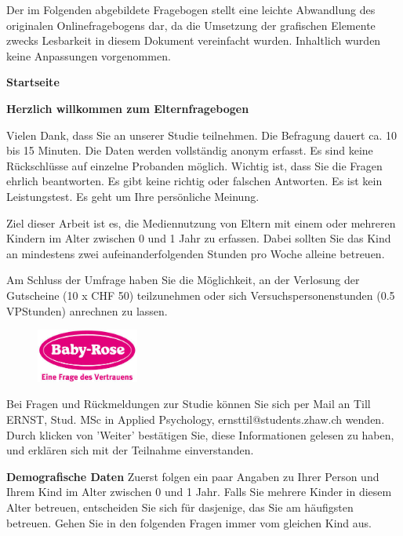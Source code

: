 Der im Folgenden abgebildete Fragebogen stellt eine leichte Abwandlung des originalen Onlinefragebogens dar, da die Umsetzung der grafischen Elemente zwecks Lesbarkeit in diesem Dokument vereinfacht wurden. Inhaltlich wurden keine Anpassungen vorgenommen.

\begin{flushleft}
\textbf{Startseite}

\textbf{Herzlich willkommen zum Elternfragebogen}

\vspace{2mm}
Vielen Dank, dass Sie an unserer Studie teilnehmen. Die Befragung dauert ca. 10 bis 15 Minuten. Die Daten werden vollständig anonym erfasst. Es sind keine Rückschlüsse auf einzelne Probanden möglich. Wichtig ist, dass Sie die Fragen ehrlich beantworten. Es gibt keine richtig oder falschen Antworten. Es ist kein Leistungstest. Es geht um Ihre persönliche Meinung.

\vspace{2mm}
Ziel dieser Arbeit ist es, die Mediennutzung von Eltern mit einem oder mehreren Kindern im Alter zwischen 0 und 1 Jahr zu erfassen. Dabei sollten Sie das Kind an mindestens zwei aufeinanderfolgenden Stunden pro Woche alleine betreuen.

\vspace{2mm}
Am Schluss der Umfrage haben Sie die Möglichkeit, an der Verlosung der Gutscheine (10 x CHF 50) teilzunehmen oder sich Versuchspersonenstunden (0.5 VPStunden) anrechnen zu lassen.

\begin{figure}[hbtp]
  \centering
     \includegraphics[width=0.3\textwidth]{content/Grafik/babyRose_Logo.jpg}
  \label{fig:babyRose_Logo}
\end{figure}

Bei Fragen und Rückmeldungen zur Studie können Sie sich per Mail an Till ERNST, Stud. MSc in Applied Psychology, ernsttil@students.zhaw.ch wenden. Durch klicken von 'Weiter' bestätigen Sie, diese Informationen gelesen zu haben, und erklären sich mit der Teilnahme einverstanden.

\bigskip
\textbf{Demografische Daten}
Zuerst folgen ein paar Angaben zu Ihrer Person und Ihrem Kind im Alter zwischen 0 und 1 Jahr. Falls Sie mehrere Kinder in diesem Alter betreuen, entscheiden Sie sich für dasjenige, das Sie am häufigsten betreuen. Gehen Sie in den folgenden Fragen immer vom gleichen Kind aus.


\end{flushleft}
